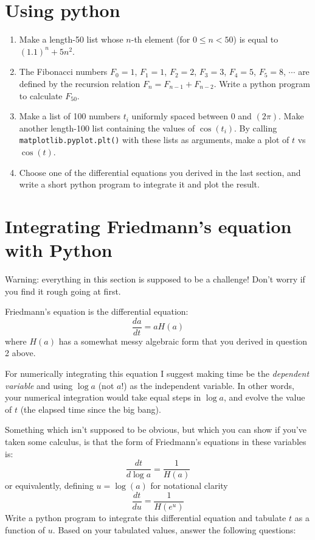 \documentclass[aps,prd,superscriptaddress,groupedaddress,nofootinbib,nobibnotes]{revtex4}
\newcommand{\be}{\begin{equation}}
\newcommand{\ee}{\end{equation}}
\begin{document}
\section{Using python}

\begin{enumerate}[resume]

\item Make a length-50 list whose $n$-th element (for $0 \le n < 50$) is equal to $(1.1)^n + 5n^2$.

\item The Fibonacci numbers $F_0=1$, $F_1=1$, $F_2=2$, $F_3=3$, $F_4=5$, $F_5=8$, $\cdots$
  are defined by the recursion relation $F_n = F_{n-1} + F_{n-2}$.  Write a python program to calculate $F_{50}$.

\item Make a list of 100 numbers $t_i$ uniformly spaced between 0 and $(2\pi)$.
  Make another length-100 list containing the values of $\cos(t_i)$.  By calling
  {\tt matplotlib.pyplot.plt()} with these lists as arguments, make a plot of $t$ vs $\cos(t)$.

\item Choose one of the differential equations you derived in the last section, and
  write a short python program to integrate it and plot the result.

\end{enumerate}

\section{Integrating Friedmann's equation with Python}

Warning: everything in this section is supposed to be a challenge!
Don't worry if you find it rough going at first.

Friedmann's equation is the differential equation:
\be
\frac{da}{dt} = a H(a)
\ee
where $H(a)$ has a somewhat messy algebraic form that you derived in question 2 above.

For numerically integrating this equation I suggest making time be the {\em dependent variable}
and using $\log a$ (not $a$!) as the independent variable.  In other words, your numerical integration
would take equal steps in $\log a$, and evolve the value of $t$ (the elapsed time since the big bang).

Something which isn't supposed to be obvious, but which you can show if you've taken some calculus,
is that the form of Friedmann's equations in these variables is:
\be
\frac{dt}{d\log a} = \frac{1}{H(a)}
\ee
or equivalently, defining $u=\log(a)$ for notational clarity
\be
\frac{dt}{du} = \frac{1}{H(e^u)}
\ee
Write a python program to integrate this differential equation and tabulate $t$ as a function of $u$.
Based on your tabulated values, answer the following questions:
\end{document}
